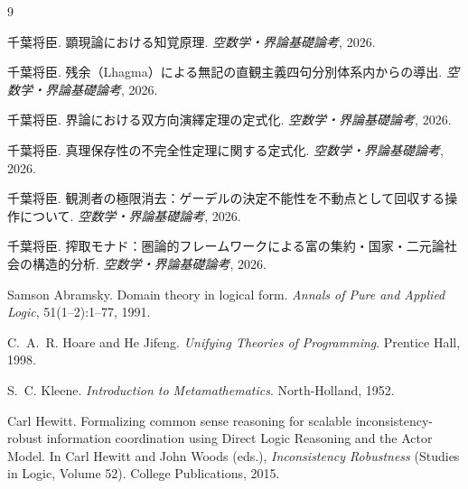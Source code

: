 \documentclass[11pt,a4paper]{ltjsarticle}
\theoremstyle{definition}
\begin{document}
\begin{thebibliography}{9}

千葉将臣.
\newblock 顕現論における知覚原理.
\newblock \emph{空数学・界論基礎論考}, 2026.

千葉将臣.
\newblock 残余（Lhagma）による無記の直観主義四句分別体系内からの導出.
\newblock \emph{空数学・界論基礎論考}, 2026.

千葉将臣.
\newblock 界論における双方向演繹定理の定式化.
\newblock \emph{空数学・界論基礎論考}, 2026.

千葉将臣.
\newblock 真理保存性の不完全性定理に関する定式化.
\newblock \emph{空数学・界論基礎論考}, 2026.

千葉将臣.
\newblock 観測者の極限消去：ゲーデルの決定不能性を不動点として回収する操作について.
\newblock \emph{空数学・界論基礎論考}, 2026.

千葉将臣.
\newblock 搾取モナド：圏論的フレームワークによる富の集約・国家・二元論社会の構造的分析.
\newblock \emph{空数学・界論基礎論考}, 2026.

Samson Abramsky.
\newblock Domain theory in logical form.
\newblock \emph{Annals of Pure and Applied Logic}, 51(1--2):1--77, 1991.

C.~A.~R. Hoare and He Jifeng.
\newblock \emph{Unifying Theories of Programming}.
\newblock Prentice Hall, 1998.

S.~C. Kleene.
\newblock \emph{Introduction to Metamathematics}.
\newblock North-Holland, 1952.

Carl Hewitt.
\newblock Formalizing common sense reasoning for scalable inconsistency-robust
information coordination using Direct Logic Reasoning and the Actor Model.
\newblock In Carl Hewitt and John Woods (eds.),
\emph{Inconsistency Robustness} (Studies in Logic, Volume 52).
College Publications, 2015.

\end{thebibliography}
\end{document}
